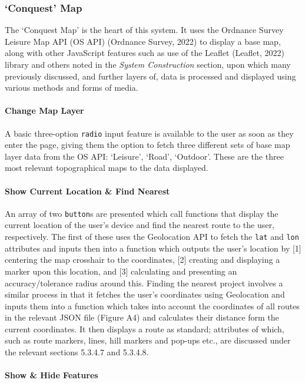 \documentclass[11pt, english]{article}
\begin{document}
		\subsubsection{`Conquest' Map}

	The `Conquest Map' is the heart of this system. It uses the Ordnance Survey Leisure Map API (OS API) (Ordnance Survey, 2022) to display a base map, along with other JavaScript features such as use of the Leaflet (Leaflet, 2022) library and others noted in the \textit{System Construction} section, upon which many previously discussed, and further layers of, data is processed and displayed using various methods and forms of media.

			\paragraph{Change Map Layer}

	A basic three-option \texttt{radio} input feature is available to the user as soon as they enter the page, giving them the option to fetch three different sets of base map layer data from the OS API: `Leisure', `Road', `Outdoor'. These are the three most relevant topographical maps to the data displayed.

			\paragraph{Show Current Location \& Find Nearest}

	An array of two \texttt{button}s are presented which call functions that display the current location of the user's device and find the nearest route to the user, respectively. The first of these uses the Geolocation API to fetch the \texttt{lat} and \texttt{lon} attributes and inputs then into a function which outputs the user's location by [1] centering the map crosshair to the coordinates, [2] creating and displaying a marker upon this location, and [3] calculating and presenting an accuracy/tolerance radius around this. Finding the nearest project involves a similar process in that it fetches the user's coordinates using Geolocation and inputs them into a function which takes into account the coordinates of all routes in the relevant JSON file (Figure A4) and calculates their distance form the current coordinates. It then displays a route as standard; attributes of which, such as route markers, lines, hill markers and pop-ups etc., are discussed under the relevant sections 5.3.4.7 and 5.3.4.8.

			\paragraph{Show \& Hide Features}
\end{document}
